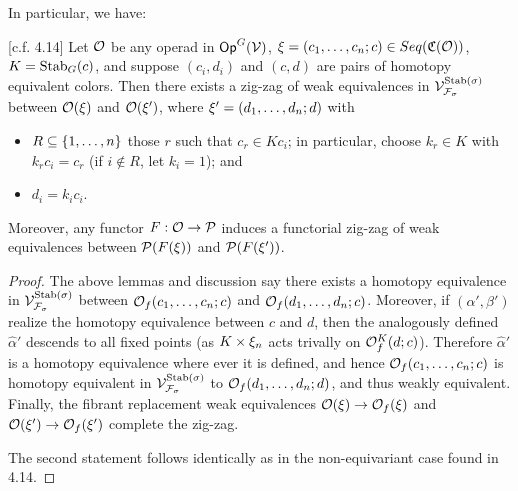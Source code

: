 \documentclass[psamsfonts,onesided,10pt,letterpaper]{amsart}%
\renewcommand{\C}{\ensuremath{\mathfrak{C}}}
\renewcommand{\F}{\mathcal F}
\renewcommand{\1}{\ensuremath{\mathbb{id}}}
\renewcommand{\P}{\ensuremath{\mathcal{P}}}
\newcommand{\Vsigma}{\ensuremath{\V^{\Stab(\sigma)}_{\F_\sigma}}}
\begin{document}
In particular, we have:
\begin{proposition}
  \label{CAV_4.14_PROP}
  [c.f. \cite{Cav14} 4.14]
  Let $\mathcal{O}$ be any operad in $\mathsf{Op}^G(\mathcal V)$, $\ksi = (c_1,\ldots,c_n;c)\in Seq(\C(\O))$, $K = \mathrm{Stab}_G(c)$, and suppose $(c_i,d_i)$ and $(c,d)$ are pairs of homotopy equivalent colors. Then there exists a zig-zag of weak equivalences in $\Vsigma$ between $\mathcal{O}(\xi)$ and $\mathcal{O}(\xi')$, where $\xi' = (d_1,\ldots, d_n;d)$ with
  \begin{itemize}
  \item $R\subseteq \left\{1,\ldots,n\right\}$ those $r$ such that $c_r\in Kc_i$; in particular, choose $k_r\in K$ with $k_r c_i = c_r$ (if $i\not\in R$, let $k_i = 1$); and
  \item $d_i = k_i c_i$.
  \end{itemize}
Moreover, any functor $F:\O\to \P$ induces a functorial zig-zag of weak equivalences between $\P(F(\ksi))$ and $\P(F(\ksi'))$.
\end{proposition}
\begin{proof}
  The above lemmas and discussion say there exists a homotopy equivalence in $\Vsigma$ between $\mathcal{O}_f(c_1,\ldots, c_n;c)$ and $\mathcal{O}_f(d_1,\ldots, d_n;c)$. Moreover, if $(\alpha',\beta')$ realize the homotopy equivalence between $c$ and $d$, then the analogously defined $\hat\alpha'$ descends to all fixed points (as $K\times\xi_n$ acts trivally on $\mathcal{O}_f^K(d;c)$). Therefore $\hat\alpha'$ is a homotopy equivalence where ever it is defined, and hence $\mathcal{O}_f(c_1,\ldots, c_n;c)$ is homotopy equivalent in $\Vsigma$ to $\mathcal{O}_f(d_1,\ldots, d_n;d)$, and thus weakly equivalent. Finally, the fibrant replacement weak equivalences $\mathcal{O}(\xi)\to\mathcal{O}_f(\xi)$ and $\mathcal{O}(\xi')\to \mathcal{O}_f(\xi')$ complete the zig-zag.

The second statement follows identically as in the non-equivariant case found in \cite{Cav14} 4.14.
\end{proof}
\end{document}
